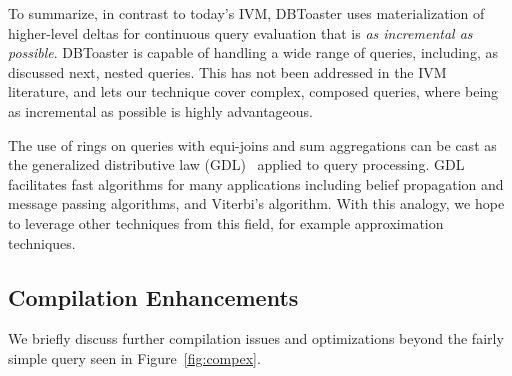 To summarize, in contrast to today's IVM, DBToaster uses materialization of
higher-level deltas for continuous query evaluation that is \textit{as
incremental as possible}. DBToaster is capable of handling a wide range of
queries, including, as discussed next, nested queries. This has not been
addressed in the IVM literature, and lets our technique cover complex, composed
queries, where being as incremental as possible is highly advantageous.

The use of rings on queries with equi-joins and sum aggregations can be cast as
the generalized distributive law (GDL)~\cite{aji-toit:00} applied to query
processing. GDL facilitates fast algorithms for many applications including
belief propagation and message passing algorithms, and Viterbi's algorithm. With
this analogy, we hope to leverage other techniques from this field, for example
approximation techniques.


\subsection{Compilation Enhancements}
\noindent We briefly discuss further compilation issues and optimizations beyond
the fairly simple query seen in Figure~\ref{fig:compex}.


